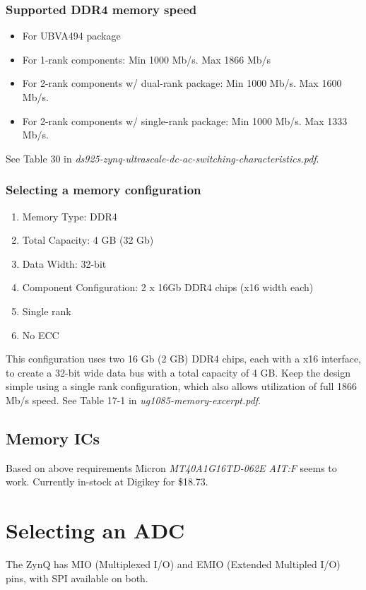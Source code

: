 \documentclass{article}
\begin{document}
\subsubsection{Supported DDR4 memory speed}
\begin{itemize}
\item For UBVA494 package
\item For 1-rank components: Min 1000 Mb/s. Max 1866 Mb/s
\item For 2-rank components w/ dual-rank package: Min 1000 Mb/s. Max 1600 Mb/s.
\item For 2-rank components w/ single-rank package: Min 1000 Mb/s. Max 1333 Mb/s.
\end{itemize}
See Table 30 in {\em ds925-zynq-ultrascale-dc-ac-switching-characteristics.pdf}. 


\subsubsection{Selecting a memory configuration}
\begin{enumerate}
\item Memory Type: DDR4
\item Total Capacity: 4 GB (32 Gb)
\item Data Width: 32-bit
\item Component Configuration: 2 x 16Gb DDR4 chips (x16 width each)
\item Single rank
\item No ECC
\end{enumerate}

This configuration uses two 16 Gb (2 GB) DDR4 chips, each with a x16 interface, to create a 32-bit wide data bus with a total capacity of 4 GB. Keep the design simple using a single rank configuration, which also allows utilization of full 1866 Mb/s speed. See Table 17-1 in {\em ug1085-memory-excerpt.pdf}. 

\subsection{Memory ICs}

Based on above requirements Micron {\em MT40A1G16TD-062E AIT:F} seems to work. Currently in-stock at Digikey for \$18.73.

\section{Selecting an ADC}

The ZynQ has MIO (Multiplexed I/O) and EMIO (Extended Multipled I/O) pins, with SPI available on both. 
\end{document}
